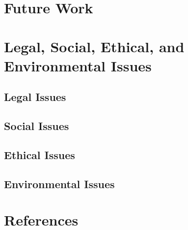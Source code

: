 \documentclass{article}
\begin{document}
\section{Future Work}

\section{Legal, Social, Ethical, and Environmental Issues}

\subsection{Legal Issues}

\subsection{Social Issues}

\subsection{Ethical Issues}

\subsection{Environmental Issues}

\section{References}
\end{document}
